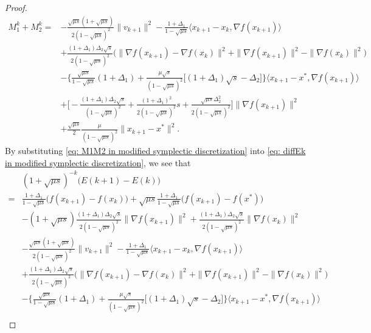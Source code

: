 \documentclass[11pt]{article}
\newcommand{\1}{\mathbf 1}
\numberwithin{equation}{section}
\begin{document}
\begin{proof}
{        \begin{equation}
        \label{eq: M1M2 in modified symplectic discretization}
        \begin{aligned}
                M_1^k+M_2^k=&-\frac{\sqrt{\mu s}(1+\sqrt{\mu s})}{2(1-\sqrt{\mu s})^2}\|v_{k+1}\|^2
        -\frac{1+\Delta_1}{1-\sqrt{\mu s}}\langle x_{k+1}-x_k,\nabla f(x_{k+1})\rangle\\
        &+\frac{(1+\Delta_1)\Delta_2\sqrt{s}}{2(1-\sqrt{\mu s})^2}\big(\|\nabla f(x_{k+1})-\nabla f(x_k)\|^2+\|\nabla f(x_{k+1})\|^2-\|\nabla f(x_k)\|^2\big)\\
        &-\Big\{\frac{\sqrt{\mu s}}{1-\sqrt{\mu s}}(1+\Delta_1)+\frac{\mu\sqrt{s}}{(1-\sqrt{\mu s})^2}\big[(1+\Delta_1)\sqrt{s}-\Delta_2\big]\Big\}\langle x_{k+1}-x^*,\nabla f(x_{k+1})\rangle\\
        &+\big[-\frac{(1+\Delta_1)\Delta_2\sqrt{s}}{(1-\sqrt{\mu s})^2}+\frac{(1+\Delta_1)^2}{2(1-\sqrt{\mu s})^2}s+\frac{\sqrt{\mu s}\Delta_2^2}{2(1-\sqrt{\mu s})^2}\big]\|\nabla f(x_{k+1})\|^2\\
        &+\frac{\sqrt{\mu s}}{2}\frac{\mu}{(1-\sqrt{\mu s})^2}\|x_{k+1}-x^*\|^2.
        \end{aligned}
       \end{equation}
       By substituting \eqref{eq: M1M2 in modified symplectic discretization} into \eqref{eq: diffEk in modified symplectic discretization}, we see that
       \begin{align*}
           &(1+\sqrt{\mu s})^{-k}\big(E(k+1)-E(k)\big)\\
           =&\frac{1+\Delta_1}{1-\sqrt{\mu s}}\big(f(x_{k+1})-f(x_k)\big)+\sqrt{\mu s}\frac{1+\Delta_1}{1-\sqrt{\mu s}}\big(f(x_{k+1})-f(x^*)\big)\\
		&-(1+\sqrt{\mu s})\frac{(1+\Delta_1)\Delta_2\sqrt{s}}{2(1-\sqrt{\mu s})^2}\|\nabla f(x_{k+1})\|^2+\frac{(1+\Delta_1)\Delta_2\sqrt{s}}{2(1-\sqrt{\mu s})^2}\|\nabla f(x_k)\|^2\\
        &-\frac{\sqrt{\mu s}(1+\sqrt{\mu s})}{2(1-\sqrt{\mu s})^2}\|v_{k+1}\|^2
        -\frac{1+\Delta_1}{1-\sqrt{\mu s}}\langle x_{k+1}-x_k,\nabla f(x_{k+1})\rangle\\
        &+\frac{(1+\Delta_1)\Delta_2\sqrt{s}}{2(1-\sqrt{\mu s})^2}\big(\|\nabla f(x_{k+1})-\nabla f(x_k)\|^2+\|\nabla f(x_{k+1})\|^2-\|\nabla f(x_k)\|^2\big)\\
        &-\Big\{\frac{\sqrt{\mu s}}{1-\sqrt{\mu s}}(1+\Delta_1)+\frac{\mu\sqrt{s}}{(1-\sqrt{\mu s})^2}\big[(1+\Delta_1)\sqrt{s}-\Delta_2\big]\Big\}\langle x_{k+1}-x^*,\nabla f(x_{k+1})\rangle\\

\end{align*}}
\end{proof}
\end{document}
